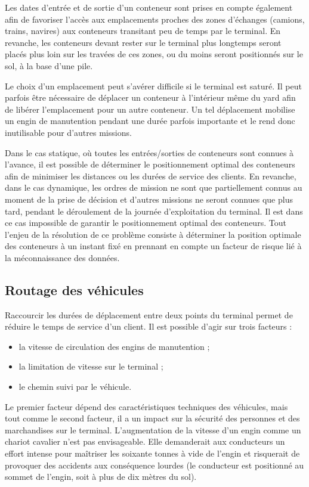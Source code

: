 Les dates d'entrée et de sortie d'un conteneur sont prises en compte également afin de favoriser l'accès aux emplacements proches des zones d'échanges (camions, trains, navires) aux conteneurs transitant peu de temps par le terminal. En revanche, les conteneurs devant rester sur le terminal plus longtemps seront placés plus loin sur les travées de ces zones, ou du moins seront positionnés sur le sol, à la base d'une pile.

Le choix d'un emplacement peut s'avérer difficile si le terminal est saturé. Il peut parfois être nécessaire de déplacer un conteneur à l'intérieur même du yard afin de libérer l'emplacement pour un autre conteneur. Un tel déplacement mobilise un engin de manutention pendant une durée parfois importante et le rend donc inutilisable pour d'autres missions.

Dans le cas statique, où toutes les entrées/sorties de conteneurs sont connues à l'avance, il est possible de déterminer le positionnement optimal des conteneurs afin de minimiser les distances ou les durées de service des clients. En revanche, dans le cas dynamique, les ordres de mission ne sont que partiellement connus au moment de la prise de décision et d'autres missions ne seront connues que plus tard, pendant le déroulement de la journée d'exploitation du terminal. Il est dans ce cas impossible de garantir le positionnement optimal des conteneurs. Tout l'enjeu de la résolution de ce problème consiste à déterminer la position optimale des conteneurs à un instant fixé en prennant en compte un facteur de risque lié à la méconnaissance des données.

\subsection{Routage des véhicules} \label{chap:contexte:opt:routageVehicules}

Raccourcir les durées de déplacement entre deux points du terminal permet de réduire le temps de service d'un client. Il est possible d'agir sur trois facteurs : 
\begin{itemize}
 \item la vitesse de circulation des engins de manutention ;
 \item la limitation de vitesse sur le terminal ; 
 \item le chemin suivi par le véhicule.
\end{itemize}

Le premier facteur dépend des caractéristiques techniques des véhicules, mais tout comme le second facteur, il a un impact sur la sécurité des personnes et des marchandises sur le terminal. L'augmentation de la vitesse d'un engin comme un chariot cavalier n'est pas envisageable. Elle demanderait aux conducteurs un effort intense pour maîtriser les soixante tonnes à vide de l'engin et risquerait de provoquer des accidents aux conséquence lourdes (le conducteur est positionné au sommet de l'engin, soit à plus de dix mètres du sol).

